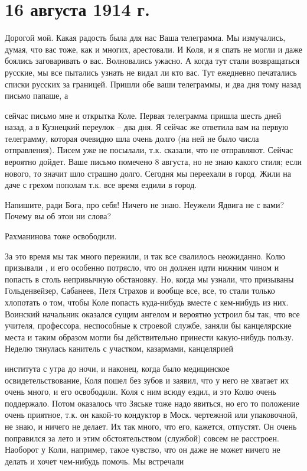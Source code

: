 \section{16 августа 1914 г.}


Дорогой мой. Какая радость была для нас Ваша телеграмма. Мы измучались, думая,
что вас тоже, как и многих, арестовали. И Коля, и я спать не могли и даже
боялись заговаривать о вас. Волновались ужасно. А когда тут стали возвращаться
русские, мы все пытались узнать не видал ли кто вас. Тут ежедневно печатались
списки русских за границей. Пришли обе ваши телеграммы, и два дня тому назад
письмо папаше, а


\noindent
сейчас письмо мне и открытка Коле. Первая телеграмма пришла шесть дней назад, а
в Кузнецкий переулок -- два дня. Я сейчас же ответила вам на первую телеграмму,
которая очевидно шла очень долго (на ней не было числа отправления). Писем уже
не посылали, т.к. сказали, что не отправляют. Сейчас вероятно дойдет. Ваше
письмо помечено 8 августа, но не знаю какого стиля; если нового, то значит шло
страшно долго. Сегодня мы переехали в город. Жили на даче с грехом пополам т.к.
все время ездили в город.

Напишите, ради Бога, про себя! Ничего не знаю. Неужели Ядвига не с вами? Почему
вы об этои ни слова?


Рахманинова тоже освободили.

За это время мы так много пережили, и так все свалилось неожиданно. Колю
призывали , и его особенно потрясло, что он должен идти нижним
чином и попасть в столь непривычную обстановку. Но, когда мы узнали, что
призываны Гольденвейзер, Сабанеев, Петя Страхов и вообще все, все, то стали
только хлопотать о том, чтобы Коле попасть куда-нибудь вместе с кем-нибудь из
них. Воинский начальник оказался сущим ангелом и вероятно устроил бы так, что
все учителя, профессора, неспособные к строевой службе, заняли бы канцелярские
места и таким образом могли бы действительно принести какую-нибудь пользу.
Неделю тянулась канитель с участком, казармами, канцелярией


\noindent
института с утра до ночи, и наконец, когда было медицинское
освидетельствование, Коля пошел без зубов и заявил, что у него не хватает их
очень много, и его освободили. Коля с ним  всюду
ездил, и это Колю очень поддержало. Потом оказалось что Зяське тоже надо
явиться, но его то положение очень приятное, т.к. он какой-то кондуктор в Моск.
чертежной или упаковочной, не знаю, и ничего не делает. Их так много, что его,
кажется, отпустят. Он очень поправился за лето и этим обстоятельством (службой)
совсем не расстроен. Наоборот у Коли, например, такое чувство, что он даже не
может ничего не делать и хочет чем-нибудь помочь. Мы встречали

